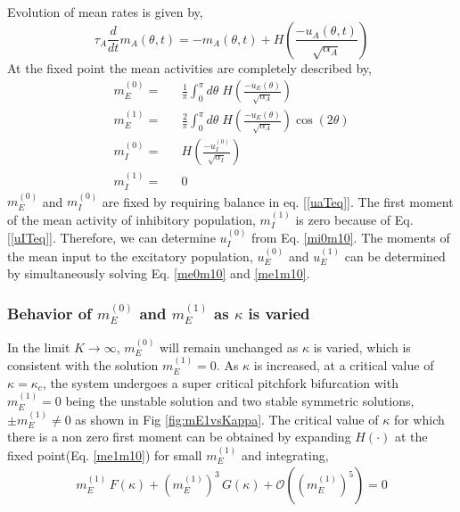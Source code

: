 Evolution of mean rates is given by,\\
\begin{equation}
\tau_A \frac{d}{dt} m_A(\theta, t) = -m_A(\theta, t) + H\left( \frac{-u_A(\theta, t)}{\sqrt{\alpha_A}} \right)
\end{equation}
At the fixed point the mean activities are completely described by, \\
\begin{eqnarray}
m_E^{(0)} =&& \frac{1}{\pi} \int_0^\pi d\theta \; H\left( \frac{-u_E(\theta)}{\sqrt{\alpha_A}} \right) \label{me0m10}\\
m_E^{(1)} =&& \frac{2}{\pi} \int_0^\pi d\theta \; H\left( \frac{-u_E(\theta)}{\sqrt{\alpha_A}}  \right) \cos(2 \theta) \label{me1m10} \\
m_I^{(0)} =&&  H\left( \frac{-u^{(0)}_I}{\sqrt{\alpha_I}} \right) \label{mi0m10} \\
m_I^{(1)} =&& 0 
\end{eqnarray}
$m_E^{(0)}$ and $m_I^{(0)}$ are fixed by requiring balance in eq. [\ref{uaTeq}]. The first moment of the mean activity of inhibitory population, $m_I^{(1)}$ is zero because of Eq.[\ref{uITeq}]. Therefore, we can determine $u_I^{(0)}$ from Eq. \ref{mi0m10}. The moments of the mean input to the excitatory population, $u_E^{(0)}$ and $u_E^{(1)}$ can be determined by simultaneously solving Eq. \ref{me0m10} and \ref{me1m10}.
\subsubsection{Behavior of $m_E^{(0)}$ and $m_E^{(1)}$ as $\kappa$ is varied}
In the limit $K \rightarrow \infty$, $m_E^{(0)}$ will remain unchanged as $\kappa$ is varied, which is consistent with the solution $m_E^{(1)} = 0$. As $\kappa$ is increased, at a critical value of $\kappa = \kappa_c$, the system undergoes a super critical pitchfork bifurcation with $m_E^{(1)} = 0$ being the unstable solution and two stable symmetric solutions, $\pm m_E^{(1)} \neq 0$ as shown in Fig \ref{fig:mE1vsKappa}. The critical value of $\kappa$ for which there is a non zero first moment can be obtained by expanding $H(\cdot)$ at the fixed point(Eq. \ref{me1m10}) for small $m_E^{(1)}$ and integrating,
\begin{eqnarray}
m_E^{(1)} \, F(\kappa) + \left( m_E^{(1)} \right)^3 \,  G(\kappa) + \mathcal{O} \left(\left( m_E^{(1)} \right)^5 \right) = 0
\end{eqnarray}

